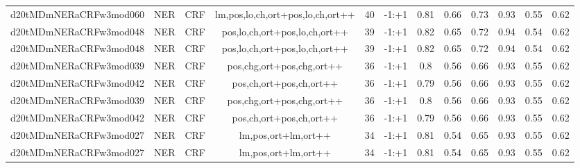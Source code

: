 \documentclass[a4paper]{article}
\begin{document}
\begin{landscape}
\begin{center}
\begin{tabular}{ |c|c|c|c|c|c|c|c|c|c|c|c|}
 	
 
 	
 		
 		\small{ d20tMDmNERaCRFw3mod060 } & NER & CRF & lm,pos,lo,ch,ort+pos,lo,ch,ort++  &  40 &  -1:+1  &  0.81 & 0.66 & 0.73  &  0.93 & 0.55 & 0.62 \\
 		

 	
 
 	
 		
 		\small{ d20tMDmNERaCRFw3mod048 } & NER & CRF & pos,lo,ch,ort+pos,lo,ch,ort++  &  39 &  -1:+1  &  0.82 & 0.65 & 0.72  &  0.94 & 0.54 & 0.62 \\
 		

 	
 
 	
 		
 		\small{ d20tMDmNERaCRFw3mod048 } & NER & CRF & pos,lo,ch,ort+pos,lo,ch,ort++  &  39 &  -1:+1  &  0.82 & 0.65 & 0.72  &  0.94 & 0.54 & 0.62 \\
 		

 	
 
 	
 		
 		\small{ d20tMDmNERaCRFw3mod039 } & NER & CRF & pos,chg,ort+pos,chg,ort++  &  36 &  -1:+1  &  0.8 & 0.56 & 0.66  &  0.93 & 0.55 & 0.62 \\
 		

 	
 
 	
 		
 		\small{ d20tMDmNERaCRFw3mod042 } & NER & CRF & pos,ch,ort+pos,ch,ort++  &  36 &  -1:+1  &  0.79 & 0.56 & 0.66  &  0.93 & 0.55 & 0.62 \\
 		

 	
 
 	
 		
 		\small{ d20tMDmNERaCRFw3mod039 } & NER & CRF & pos,chg,ort+pos,chg,ort++  &  36 &  -1:+1  &  0.8 & 0.56 & 0.66  &  0.93 & 0.55 & 0.62 \\
 		

 	
 
 	
 		
 		\small{ d20tMDmNERaCRFw3mod042 } & NER & CRF & pos,ch,ort+pos,ch,ort++  &  36 &  -1:+1  &  0.79 & 0.56 & 0.66  &  0.93 & 0.55 & 0.62 \\
 		

 	
 
 	
 		
 		\small{ d20tMDmNERaCRFw3mod027 } & NER & CRF & lm,pos,ort+lm,ort++  &  34 &  -1:+1  &  0.81 & 0.54 & 0.65  &  0.93 & 0.55 & 0.62 \\
 		

 	
 
 	
 		
 		\small{ d20tMDmNERaCRFw3mod027 } & NER & CRF & lm,pos,ort+lm,ort++  &  34 &  -1:+1  &  0.81 & 0.54 & 0.65  &  0.93 & 0.55 & 0.62 \\
 		


\end{tabular}
\end{center}
\end{landscape}
\end{document}
